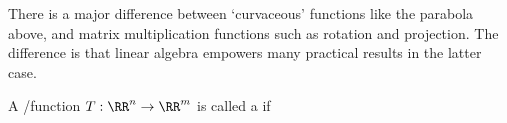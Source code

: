 There is a major difference between `curvaceous' functions like the parabola above, and matrix multiplication functions such as rotation and projection.
The difference is that linear algebra empowers many practical results in the latter case.



\begin{definition} \label{def:lintran} 
A \slash function \(T:\RR^n\to\RR^m\) is called a  if
\end{definition}


